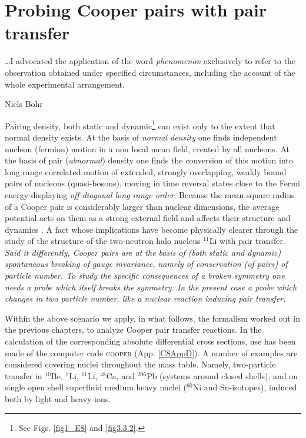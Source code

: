  \chapter{Probing Cooper pairs with pair transfer}\label{C8}
  \epigraph{\dots I advocated the application of the word \textit{phenomenon} exclusively to refer to the observation obtained under specified circumstances, including the account of the whole experimental arrangement.}{Niels Bohr}
Pairing density, both static  and dynamic\footnote{See Figs. \ref{fig1_E8} and \ref{fig3.3.2}.}  can exist only to the extent that normal density exists. At the basis of \textit{normal density} one finds independent nucleon (fermion) motion in a non local mean field, created by all nucleons. At the basis of pair (\textit{abnormal}) density one finds the conversion of this motion into long range correlated motion of extended, strongly overlapping, weakly bound pairs  of nucleons (quasi-bosons), moving in time reversal states close to the Fermi energy displaying \textit{off diagonal long range order}. Because the mean square radius of a Cooper pair is considerably larger than nuclear dimensions, the average potential acts on them as a strong external field and affects their structure and dynamics 
. A fact whose implications have become physically clearer through the study of the structure of the two-neutron  halo nucleus $^{11}$Li with pair transfer. \textit{Said it differently, Cooper pairs are at the basis of (both static and dynamic) spontaneous breaking of gauge invariance, namely of conservation (of pairs) of particle number. To study the specific consequences of a broken symmetry one needs a probe which itself breaks the symmetry. In the present case a probe which changes in two particle number, like a nuclear reaction inducing  pair transfer.}

Within the above scenario we apply, in   what follows, the formalism worked out in the previous chapters, to analyze Cooper pair transfer reactions. In the calculation of the corresponding absolute differential cross sections, use has been made of the computer code \textsc{cooper} (App. \ref{C8AppD}).
 A number of examples are considered covering nuclei throughout the mass table. Namely,   two-particle transfer  in $^{10}$Be,    $^{7}$Li, $^{11}$Li, $^{48}$Ca, and $^{206}$Pb (systems around closed shells), and on single open shell superfluid   medium heavy nuclei ($^{60}$Ni and Sn-isotopes), induced both by light and heavy ions.
